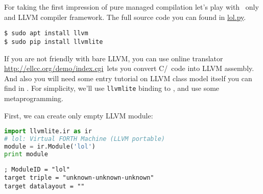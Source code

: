 \clearpage{}\label{llvmpy}

For taking the first impression of pure managed compilation let's play with
\py\ only and LLVM compiler framework. The full source code you can found in
\href{https://github.com/ponyatov/o/blob/master/lol.py}{lol.py}.

\begin{lstlisting}
$ sudo apt install llvm
$ sudo pip install llvmlite
\end{lstlisting}

\noindent
If you are not friendly with bare LLVM, you can use online translator 
\url{http://ellcc.org/demo/index.cgi}\ lets you convert C/\cpp\ code into
LLVM assembly. And also you will need some entry tutorial on LLVM class model
itself you can find in \cite{llvmcore}. For simplicity, we'll use
\verb|llvmlite| binding to \py, and use some metaprogramming.

\pg
First, we can create only empty LLVM module:
\begin{lstlisting}[language=Python]
import llvmlite.ir as ir
# lol: Virtual FORTH Machine (LLVM portable)
module = ir.Module('lol')
print module
\end{lstlisting}
\begin{lstlisting}
; ModuleID = "lol"
target triple = "unknown-unknown-unknown"
target datalayout = ""
\end{lstlisting}
